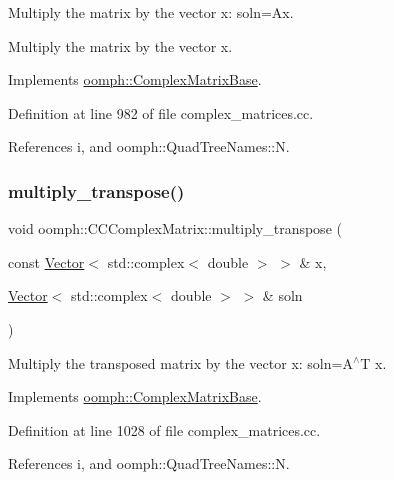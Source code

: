 Multiply the matrix by the vector x\+: soln=Ax. 

Multiply the matrix by the vector x. 

Implements \hyperlink{classoomph_1_1ComplexMatrixBase_a730c106643464a29ebf0660a6921ebaa}{oomph\+::\+Complex\+Matrix\+Base}.



Definition at line 982 of file complex\+\_\+matrices.\+cc.



References i, and oomph\+::\+Quad\+Tree\+Names\+::N.

\mbox{\label{classoomph_1_1CCComplexMatrix_a85c89a6e460b6eb0a1ab704b6272c4d7}} 
\subsubsection{\texorpdfstring{multiply\+\_\+transpose()}{multiply\_transpose()}}
{\footnotesize\ttfamily void oomph\+::\+C\+C\+Complex\+Matrix\+::multiply\+\_\+transpose (\begin{DoxyParamCaption}\item[{const \hyperlink{classoomph_1_1Vector}{Vector}$<$ std\+::complex$<$ double $>$ $>$ \&}]{x,  }\item[{\hyperlink{classoomph_1_1Vector}{Vector}$<$ std\+::complex$<$ double $>$ $>$ \&}]{soln }\end{DoxyParamCaption})\hspace{0.3cm}{\ttfamily [virtual]}}



Multiply the transposed matrix by the vector x\+: soln=A$^\wedge$T x. 



Implements \hyperlink{classoomph_1_1ComplexMatrixBase_a90c7832bad84aad3d0f437925efb089a}{oomph\+::\+Complex\+Matrix\+Base}.



Definition at line 1028 of file complex\+\_\+matrices.\+cc.



References i, and oomph\+::\+Quad\+Tree\+Names\+::N.

\mbox{\label{classoomph_1_1CCComplexMatrix_a62540288d116687aa4bd201787845b4d}} 
